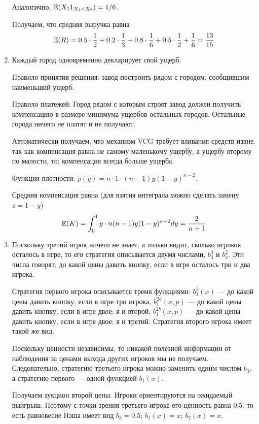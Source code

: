 \begin{enumerate}
Аналогично, $ \operatorname{\mathbb{E}}(X_{1}1_{X_{1}<X_{2}})=1/6 $.

Получаем, что средняя выручка равна
\begin{equation}
\operatorname{\mathbb{E}}(R)=0.5\cdot \frac{1}{2}+0.2\cdot \frac{1}{3}+0.8\cdot \frac{1}{6}+0.5\cdot \frac{1}{2}+\frac{1}{6}=\frac{13}{15}
\end{equation}

\item  Каждый город одновременно декларирует свой ущерб. 

Правило принятия решения: завод построить рядом с городом, сообщившим наименьший ущерб.

Правило платежей: Город рядом с которым строят завод должен получить компенсацию в размере минимума ущербов остальных городов. Остальные города ничего не платят и не получают.

Автоматически получаем, что механизм VCG требует вливания средств извне. так как компенсация равна не самому маленькому ущербу, а ущербу второму по малости, то: компенсация всегда больше ущерба.

Функция плотности: $ p(y)=n\cdot 1\cdot (n-1)y(1-y)^{n-2} $.

Средняя компенсация равна (для взятия интеграла можно сделать замену $ z=1-y $)
\begin{equation}
\operatorname{\mathbb{E}}(K)=\int_{0}^{1}y\cdot n(n-1)y(1-y)^{n-2}dy=\frac{2}{n+1}
\end{equation}




\item  Поскольку третий игрок ничего не знает, а только видит, сколько игроков осталось в игре, то его стратегия описывается двумя числами, $ b_{3}^{3} $ и $ b_{3}^{2} $. Эти числа говорят, до какой цены давить кнопку, если в игре осталось три и два игрока. 

Стратегия первого игрока описывается тремя функциями: $ b_{1}^{3}(x) $ — до какой цены давить кнопку, если в игре три игрока, $b_{1}^{2a}(x,p)$ — до какой цены давить кнопку, если в игре двое: я и второй; $b_{1}^{2b}(x,p)$ — до какой цены давить кнопку, если в игре двое: я и третий. Стратегия второго игрока имеет такой же вид.

Поскольку ценности независимы, то никакой полезной информации от наблюдения за ценами выхода других игроков мы не получаем. Следовательно, стратегию третьего игрока можно заменить одним числом $ b_{3} $, а стратегию первого — одной функцией $b_{1}(x)$.

Получаем аукцион второй цены. Игроки ориентируются на ожидаемый выигрыш. Поэтому с точки зрения третьего игрока его ценность равна 0.5. то есть равновесие Нэша имеет вид $ b_{3}=0.5 $; $ b_{1}(x)=x $; $ b_{2}(x)=x $.


\end{enumerate}
